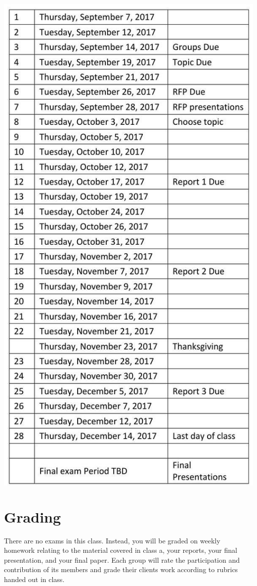 \documentclass[10pt]{article}
\begin{document}
\includegraphics[max width=\textwidth]{2022_07_05_5945264bba2a5f6ba667g-08}

\section{Grading}
There are no exams in this class. Instead, you will be graded on weekly homework relating to the material covered in class a, your reports, your final presentation, and your final paper. Each group will rate the participation and contribution of its members and grade their clients work according to rubrics handed out in class.
\end{document}
